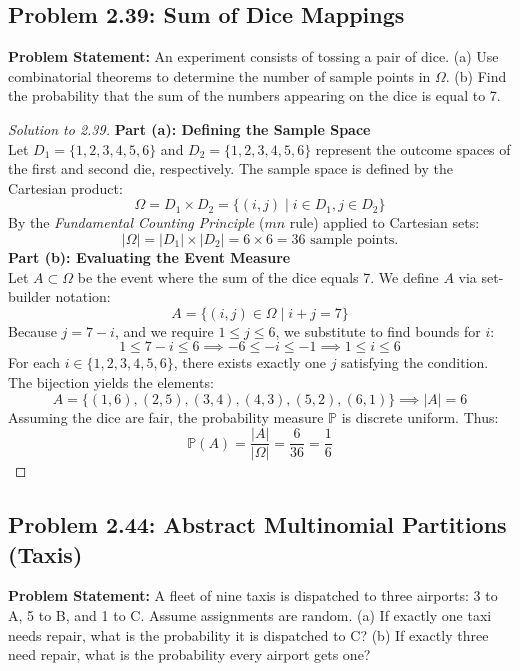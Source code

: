\documentclass[11pt]{article}
\theoremstyle{definition}
\theoremstyle{plain}
\theoremstyle{remark}
\newcommand{\Prob}{\mathbb{P}}
\newcommand{\sample}{\Omega}
\begin{document}
\subsection{Problem 2.39: Sum of Dice Mappings}
\textbf{Problem Statement:} An experiment consists of tossing a pair of dice. (a) Use combinatorial theorems to determine the number of sample points in $\sample$. (b) Find the probability that the sum of the numbers appearing on the dice is equal to 7.

\begin{proof}[Solution to 2.39]
\textbf{Part (a): Defining the Sample Space} \\
Let $D_1 = \{1, 2, 3, 4, 5, 6\}$ and $D_2 = \{1, 2, 3, 4, 5, 6\}$ represent the outcome spaces of the first and second die, respectively. The sample space is defined by the Cartesian product:
\[
\sample = D_1 \times D_2 = \{(i, j) \mid i \in D_1, j \in D_2\}
\]
By the \textit{Fundamental Counting Principle} ($mn$ rule) applied to Cartesian sets:
\[
|\sample| = |D_1| \times |D_2| = 6 \times 6 = 36 \text{ sample points.}
\]
\textbf{Part (b): Evaluating the Event Measure} \\
Let $A \subset \sample$ be the event where the sum of the dice equals 7. We define $A$ via set-builder notation:
\[
A = \{(i, j) \in \sample \mid i + j = 7\}
\]
Because $j = 7 - i$, and we require $1 \le j \le 6$, we substitute to find bounds for $i$:
\[
1 \le 7 - i \le 6 \implies -6 \le -i \le -1 \implies 1 \le i \le 6
\]
For each $i \in \{1, 2, 3, 4, 5, 6\}$, there exists exactly one $j$ satisfying the condition. The bijection yields the elements:
\[
A = \{(1,6), (2,5), (3,4), (4,3), (5,2), (6,1)\} \implies |A| = 6
\]
Assuming the dice are fair, the probability measure $\Prob$ is discrete uniform. Thus:
\[
\Prob(A) = \frac{|A|}{|\sample|} = \frac{6}{36} = \frac{1}{6}
\]
\end{proof}

\subsection{Problem 2.44: Abstract Multinomial Partitions (Taxis)}
\textbf{Problem Statement:} A fleet of nine taxis is dispatched to three airports: 3 to A, 5 to B, and 1 to C. Assume assignments are random. (a) If exactly one taxi needs repair, what is the probability it is dispatched to C? (b) If exactly three need repair, what is the probability every airport gets one?
\end{document}
